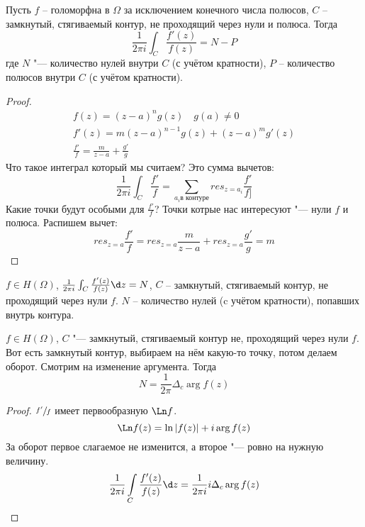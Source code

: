 \begin{theorem}
	Пусть $f$ -- голоморфна в $\Omega$ за исключением конечного числа полюсов,
	$C$ -- замкнутый, стягиваемый контур, не проходящий через нули и полюса.
	Тогда
	\[ \frac{1}{2\pi i} \int_C \frac{f'(z)}{f(z)} = N - P \]
	где $N$ "--- количество нулей внутри $C$ (с учётом кратности),
	$P$ -- количество полюсов внутри $C$ (с учётом кратности).
\end{theorem}

\begin{proof}
	\begin{gather*}
		f(z) = (z - a)^n g(z) \quad g(a) \ne 0 \\
		f'(z) = m(z - a)^{n-1} g(z) + (z - a)^m g'(z) \\
		\frac{f'}{f} = \frac{m}{z-a} + \frac{g'}{g}
	\end{gather*}
	Что такое интеграл который мы считаем? Это сумма вычетов:
	\[
		\frac{1}{2\pi i} \int _C \frac{f'}{f} = \sum_{a_i \text{в контуре}} res_{z = a_i} \frac{f'}{f]}
	\]
	Какие точки будут особыми для $\frac{f'}f$?
	Точки котрые нас интересуют "--- нули $f$ и полюса.
	Распишем вычет:
	\[ res_{z = a} \frac{f'}{f} = res_{z = a} \frac{m}{z - a} + res_{z = a} \frac{g'}{g} = m \]
\end{proof}

\begin{conseq}
	$f \in H(\Omega)$, $\frac1{2\pi i} \int_C \frac{f'(z)}{f(z)} \d z = N$,
	$C$ -- замкнутый, стягиваемый контур, не проходящий через нули $f$.
	$N$ -- количество нулей (c учётом кратности), попавших внутрь контура.
\end{conseq}

\begin{conseq}
	$f \in H(\Omega)$, $C$ "--- замкнутый, стягиваемый контур не, проходящий через нули $f$.
	Вот есть замкнутый контур, выбираем на нём какую-то точку, потом делаем оборот.
	Смотрим на изменение аргумента.
	Тогда
	\[ N = \frac1{2\pi} \Delta_c \arg f(z) \]
	\begin{proof}
		$\sfrac{f'}f$ имеет первообразную $\Ln f$.
		\[ \Ln f(z) = \ln |f(z)| + i \arg f(z) \]
		За оборот первое слагаемое не изменится, а второе "--- ровно на нужную величину.
		\[ \frac1{2\pi i} \int\limits_C \frac{f'(z)}{f(z)} \d z = \frac1{2\pi i} i \Delta_c \arg f(z) \]
	\end{proof}
\end{conseq}

